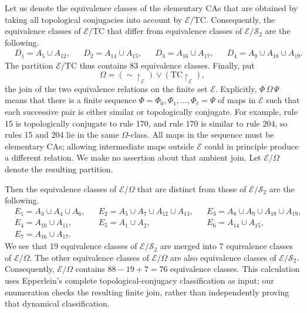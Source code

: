 \documentclass[11pt,a4paper]{article}
\newcommand{\rev}[1]{{\color{blue}#1}}
\newenvironment{revision}{\color{blue}}{}
\newcommand{\rev}[1]{{\color{black}#1}}
\newenvironment{revision}{\color{black}}{}
\newcommand{\locmark}[1]{\label{#1}\linelabel{line:#1}}
\begin{document}
Let us denote the equivalence classes of the \rev{elementary CAs} that are obtained by taking
all topological conjugacies into account by $\mathcal{E} / \mathrm{TC}$.
Consequently, the equivalence classes of $\mathcal{E} / \mathrm{TC}$ that differ from equivalence classes of $\mathcal{E}/ \mathcal{S}_2$
are the following.
\begin{align*}
& D_1 = A_5 \cup A_{12}, & & D_2 = A_{14} \cup A_{15}, & & D_3 = A_{16} \cup A_{17},
& & D_4 = A_{9} \cup A_{18} \cup A_{19}.
\end{align*}
The partition $\mathcal{E}/\mathrm{TC}$ thus contains 83 equivalence classes.
\begin{revision}
Finally, put
\locmark{loc:join}
\[
\Omega=(\sim\!\upharpoonright_{\mathcal E})\vee
       (\mathrm{TC}\!\upharpoonright_{\mathcal E}),
\]
the join of the two equivalence relations on the finite set $\mathcal E$.
Explicitly, $\Phi\,\Omega\,\Psi$ means that there is a finite sequence
$\Phi=\Phi_0,\Phi_1,\ldots,\Phi_\ell=\Psi$ of maps in $\mathcal E$
such that each successive pair is either similar or topologically
conjugate. For example, rule 15 is topologically conjugate to rule 170,
and rule 170 is similar to rule 204, so rules 15 and 204 lie in the
same $\Omega$-class. All maps in the sequence must be elementary CAs;
allowing intermediate maps outside $\mathcal E$ could in principle
produce a different relation. We make no assertion about that
ambient join. Let $\mathcal E/\Omega$ denote the resulting partition.
\end{revision}

Then the equivalence classes of $\mathcal{E}/ \Omega$ that are distinct from those of
$\mathcal{E} / \mathcal{S}_2$ are the following.
\begin{align*}
& E_1 = A_3 \cup A_4 \cup A_6, & & E_2=A_5 \cup A_7 \cup A_{12} \cup A_{13}, & & E_3=A_8 \cup A_9 \cup A_{18} \cup A_{19}, \\
& E_4 = A_{10} \cup A_{11}, & & E_5 = A_1 \cup A_2, & & E_6 = A_{14} \cup A_{15}, \\
& E_7 = A_{16} \cup A_{17}. & & & &
\end{align*}
We see that 19 equivalence classes of $\mathcal{E} / \mathcal{S}_2$ are merged into
7 equivalence classes of $\mathcal{E} / \Omega$.
The other equivalence classes of $\mathcal{E} / \Omega$ are also equivalence classes of $\mathcal{E} / \mathcal{S}_2$.
\rev{Consequently, $\mathcal{E} / \Omega$ contains $88 - 19 + 7 = 76$ equivalence classes.
This calculation uses Epperlein's complete topological-conjugacy
classification as input; our enumeration checks the resulting finite
join, rather than independently proving that dynamical classification.}
\end{document}
